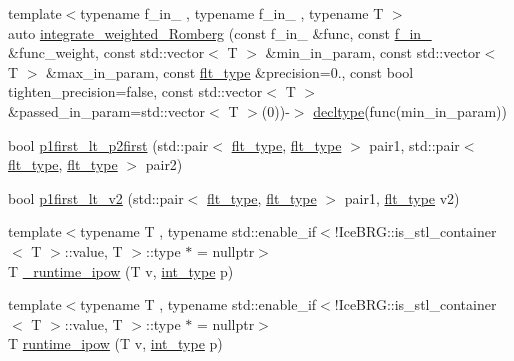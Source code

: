 \begin{DoxyCompactItemize}
\item 
{\footnotesize template$<$typename f\-\_\-in\-\_ , typename f\-\_\-in\-\_ , typename T $>$ }\\auto \hyperlink{namespaceIceBRG_a8ff7cad0caa44a8e1200d0d72bae4ed9}{integrate\-\_\-weighted\-\_\-\-Romberg} (const f\-\_\-in\-\_ \&func, const \hyperlink{namespaceIceBRG_adc45d5d0dcb62999139c819c97077451}{f\-\_\-in\-\_} \&func\-\_\-weight, const std\-::vector$<$ T $>$ \&min\-\_\-in\-\_\-param, const std\-::vector$<$ T $>$ \&max\-\_\-in\-\_\-param, const \hyperlink{lib_2IceBRG__main_2common_8h_ad0f130a56eeb944d9ef2692ee881ecc4}{flt\-\_\-type} \&precision=0., const bool tighten\-\_\-precision=false, const std\-::vector$<$ T $>$ \&passed\-\_\-in\-\_\-param=std\-::vector$<$ T $>$(0))-\/$>$ \hyperlink{namespaceIceBRG_a528e5024ecab03049320529180ae84a8}{decltype}(func(min\-\_\-in\-\_\-param))
\item 
bool \hyperlink{namespaceIceBRG_a7edd8a20990998ff70f754bfc538ee75}{p1first\-\_\-lt\-\_\-p2first} (std\-::pair$<$ \hyperlink{lib_2IceBRG__main_2common_8h_ad0f130a56eeb944d9ef2692ee881ecc4}{flt\-\_\-type}, \hyperlink{lib_2IceBRG__main_2common_8h_ad0f130a56eeb944d9ef2692ee881ecc4}{flt\-\_\-type} $>$ pair1, std\-::pair$<$ \hyperlink{lib_2IceBRG__main_2common_8h_ad0f130a56eeb944d9ef2692ee881ecc4}{flt\-\_\-type}, \hyperlink{lib_2IceBRG__main_2common_8h_ad0f130a56eeb944d9ef2692ee881ecc4}{flt\-\_\-type} $>$ pair2)
\item 
bool \hyperlink{namespaceIceBRG_a1f1e1dd28db99e71a21174fd343959a4}{p1first\-\_\-lt\-\_\-v2} (std\-::pair$<$ \hyperlink{lib_2IceBRG__main_2common_8h_ad0f130a56eeb944d9ef2692ee881ecc4}{flt\-\_\-type}, \hyperlink{lib_2IceBRG__main_2common_8h_ad0f130a56eeb944d9ef2692ee881ecc4}{flt\-\_\-type} $>$ pair1, \hyperlink{lib_2IceBRG__main_2common_8h_ad0f130a56eeb944d9ef2692ee881ecc4}{flt\-\_\-type} v2)
\item 
{\footnotesize template$<$typename T , typename std\-::enable\-\_\-if$<$!\-Ice\-B\-R\-G\-::is\-\_\-stl\-\_\-container$<$ T $>$\-::value, T $>$\-::type $\ast$  = nullptr$>$ }\\T \hyperlink{namespaceIceBRG_ad1f5b3c9b2eb70ba214aba9328126012}{\-\_\-runtime\-\_\-ipow} (T v, \hyperlink{lib_2IceBRG__main_2common_8h_ac4de9d9335536ac22821171deec8d39e}{int\-\_\-type} p)
\item 
{\footnotesize template$<$typename T , typename std\-::enable\-\_\-if$<$!\-Ice\-B\-R\-G\-::is\-\_\-stl\-\_\-container$<$ T $>$\-::value, T $>$\-::type $\ast$  = nullptr$>$ }\\T \hyperlink{namespaceIceBRG_a0cd4e17ad6fb6e8df06e33ebc54c349b}{runtime\-\_\-ipow} (T v, \hyperlink{lib_2IceBRG__main_2common_8h_ac4de9d9335536ac22821171deec8d39e}{int\-\_\-type} p)

\end{DoxyCompactItemize}
